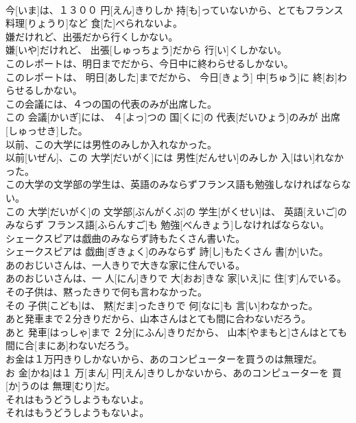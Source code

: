 \documentclass[8pt]{extreport}
\begin{document}
\begin{CJK}{UTF8}{min}
\\	今[いま]は、１３００ 円[えん]きりしか 持[も]っていないから、とてもフランス 料理[りょうり]など 食[た]べられないよ。	
\\	嫌だけれど、出張だから行くしかない。	
\\	嫌[いや]だけれど、 出張[しゅっちょう]だから 行[い]くしかない。	
\\	このレポートは、明日までだから、今日中に終わらせるしかない。	
\\	このレポートは、 明日[あした]までだから、 今日[きょう] 中[ちゅう]に 終[お]わらせるしかない。	
\\	この会議には、４つの国の代表のみが出席した。	
\\	この 会議[かいぎ]には、 ４[よっ]つの 国[くに]の 代表[だいひょう]のみが 出席[しゅっせき]した。	
\\	以前、この大学には男性のみしか入れなかった。	
\\	以前[いぜん]、この 大学[だいがく]には 男性[だんせい]のみしか 入[はい]れなかった。	
\\	この大学の文学部の学生は、英語のみならずフランス語も勉強しなければならない。	
\\	この 大学[だいがく]の 文学部[ぶんがくぶ]の 学生[がくせい]は、 英語[えいご]のみならず フランス語[ふらんすご]も 勉強[べんきょう]しなければならない。	
\\	シェークスピアは戯曲のみならず詩もたくさん書いた。	
\\	シェークスピアは 戯曲[ぎきょく]のみならず 詩[し]もたくさん 書[か]いた。	
\\	あのおじいさんは、一人きりで大きな家に住んでいる。	
\\	あのおじいさんは、一 人[にん]きりで 大[おお]きな 家[いえ]に 住[す]んでいる。	
\\	その子供は、黙ったきりで何も言わなかった。	
\\	その 子供[こども]は、 黙[だま]ったきりで 何[なに]も 言[い]わなかった。	
\\	あと発車まで２分きりだから、山本さんはとても間に合わないだろう。	
\\	あと 発車[はっしゃ]まで ２分[にふん]きりだから、 山本[やまもと]さんはとても 間に合[まにあ]わないだろう。	
\\	お金は１万円きりしかないから、あのコンピューターを買うのは無理だ。	
\\	お 金[かね]は１ 万[まん] 円[えん]きりしかないから、あのコンピューターを 買[か]うのは 無理[むり]だ。	
\\	それはもうどうしようもないよ。	
\\	それはもうどうしようもないよ。	

\end{CJK}
\end{document}
